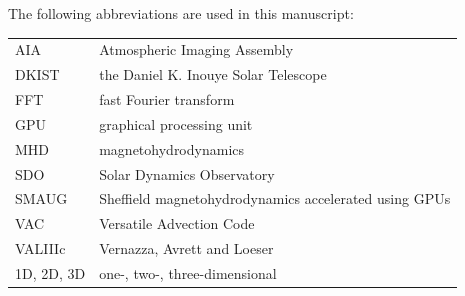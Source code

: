 \documentclass[physics,article,accept,pdftex,moreauthors]{Definitions/mdpi}
\begin{document}




{} {The following abbreviations are used in this manuscript:\\

\noindent 
\begin{tabular}{@{}ll}
AIA & Atmospheric Imaging Assembly \\
{DKIST} & the Daniel K. Inouye Solar Telescope\\
FFT & {fast Fourier transform} \\
GPU & {graphical processing unit} \\
MHD & {magnetohydrodynamics} \\
SDO & Solar Dynamics Observatory \\
SMAUG & Sheffield {magnetohydrodynamics accelerated using} GPUs \\
VAC & Versatile Advection Code \\
VALIIIc & Vernazza, Avrett and Loeser\\
{1D,} 2D, 3D & one-, two-, three-dimensional

\end{tabular}
}
\end{document}
